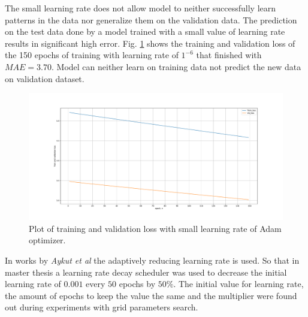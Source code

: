 The small learning rate does not allow model to neither successfully learn patterns in the data nor generalize them on the validation data. The prediction on the test data done by a model trained with a small value of learning rate results in significant high error. Fig. \ref{fig:lr} shows the training and validation loss of the 150 epochs of training with learning rate of $1^{-6}$ that finished with $MAE = 3.70$. Model can neither learn on training data not predict the new data on validation dataset. 
\begin{figure}[htb]
	\begin{center}
		\includegraphics[width=1\textwidth, keepaspectratio]{gfx/lstm1_lr_low.pdf}
		\caption{\label{fig:lr} Plot of training and validation loss with small learning rate of Adam optimizer.}
	\end{center}
\end{figure}

In works \cite{delay_compensation_360, telepresence} by \textit{Aykut et al} the adaptively reducing learning rate is used. So that in master thesis a learning rate decay scheduler was used to decrease the initial learning rate of $0.001$ every $50$ epochs by $50\%$. The initial value for learning rate, the amount of epochs to keep the value the same and the multiplier were found out during experiments with grid parameters search. 

